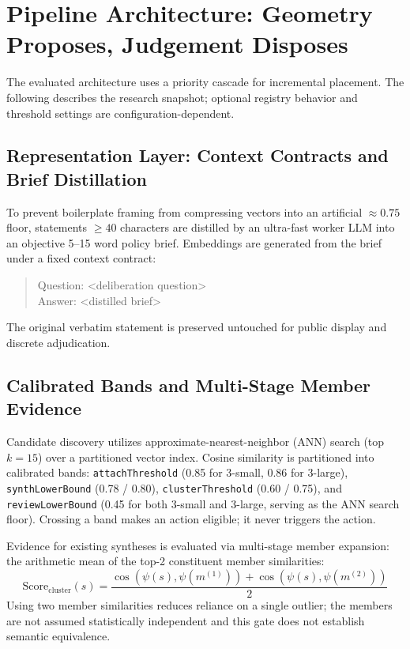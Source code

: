 \documentclass[11pt,a4paper]{article}
\begin{document}
\section{Pipeline Architecture: Geometry Proposes, Judgement Disposes}

The evaluated architecture uses a priority cascade for incremental placement. The following describes the research snapshot; optional registry behavior and threshold settings are configuration-dependent.

\subsection{Representation Layer: Context Contracts and Brief Distillation}

To prevent boilerplate framing from compressing vectors into an artificial $\approx 0.75$ floor, statements $\geq 40$ characters are distilled by an ultra-fast worker LLM into an objective 5--15 word policy brief. Embeddings are generated from the brief under a fixed context contract:
\begin{quote}\small\ttfamily
Question: <deliberation question>\\
Answer: <distilled brief>
\end{quote}
The original verbatim statement is preserved untouched for public display and discrete adjudication.

\subsection{Calibrated Bands and Multi-Stage Member Evidence}

Candidate discovery utilizes approximate-nearest-neighbor (ANN) search (top $k=15$) over a partitioned vector index. Cosine similarity is partitioned into calibrated bands: \texttt{attachThreshold} (0.85 for 3-small, 0.86 for 3-large), \texttt{synthLowerBound} (0.78 / 0.80), \texttt{clusterThreshold} (0.60 / 0.75), and \texttt{reviewLowerBound} (0.45 for both 3-small and 3-large, serving as the ANN search floor). Crossing a band makes an action eligible; it never triggers the action.

Evidence for existing syntheses is evaluated via multi-stage member expansion: the arithmetic mean of the top-2 constituent member similarities:
\begin{equation}
\mathrm{Score}_{\mathrm{cluster}}(s) = \frac{\cos(\psi(s), \psi(m^{(1)})) + \cos(\psi(s), \psi(m^{(2)}))}{2}
\end{equation}
Using two member similarities reduces reliance on a single outlier; the members are not assumed statistically independent and this gate does not establish semantic equivalence.
\end{document}
